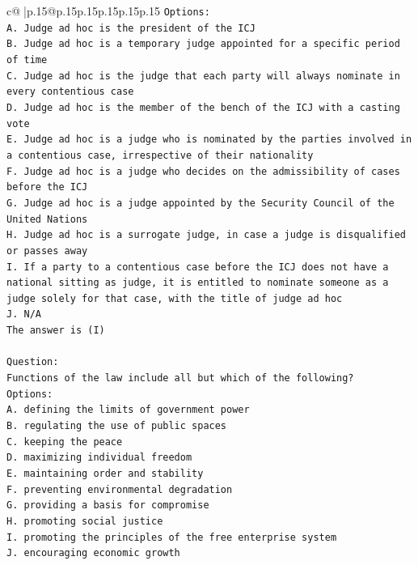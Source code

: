 \documentclass{article}
\begin{document}
{\begin{supertabular}{c@{$\;$}|p{.15\linewidth}@{}p{.15\linewidth}p{.15\linewidth}p{.15\linewidth}p{.15\linewidth}p{.15\linewidth}}
{{{\texttt{Options:} \\
\texttt{A. Judge ad hoc is the president of the ICJ} \\
\texttt{B. Judge ad hoc is a temporary judge appointed for a specific period of time} \\
\texttt{C. Judge ad hoc is the judge that each party will always nominate in every contentious case} \\
\texttt{D. Judge ad hoc is the member of the bench of the ICJ with a casting vote} \\
\texttt{E. Judge ad hoc is a judge who is nominated by the parties involved in a contentious case, irrespective of their nationality} \\
\texttt{F. Judge ad hoc is a judge who decides on the admissibility of cases before the ICJ} \\
\texttt{G. Judge ad hoc is a judge appointed by the Security Council of the United Nations} \\
\texttt{H. Judge ad hoc is a surrogate judge, in case a judge is disqualified or passes away} \\
\texttt{I. If a party to a contentious case before the ICJ does not have a national sitting as judge, it is entitled to nominate someone as a judge solely for that case, with the title of judge ad hoc} \\
\texttt{J. N/A} \\
\texttt{The answer is (I)} \\
\\ 
\texttt{Question:} \\
\texttt{Functions of the law include all but which of the following?} \\
\texttt{Options:} \\
\texttt{A. defining the limits of government power} \\
\texttt{B. regulating the use of public spaces} \\
\texttt{C. keeping the peace} \\
\texttt{D. maximizing individual freedom} \\
\texttt{E. maintaining order and stability} \\
\texttt{F. preventing environmental degradation} \\
\texttt{G. providing a basis for compromise} \\
\texttt{H. promoting social justice} \\
\texttt{I. promoting the principles of the free enterprise system} \\
\texttt{J. encouraging economic growth} \\
}}}
\end{supertabular}}
\end{document}
